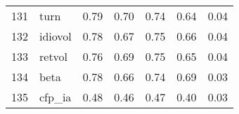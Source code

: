 \documentclass[12pt]{article}
\begin{document}
\begin{footnotesize}
\begin{longtable}{rl|c|c|c|c|c}
				131                  & turn                        & 0.79                             & 0.70                                                                                          & 0.74                                                                                          & 0.64                                                                                          & 0.04                                                                                                   \\
				132                  & idiovol                     & 0.78                             & 0.67                                                                                          & 0.75                                                                                          & 0.66                                                                                          & 0.04                                                                                                   \\
				133                  & retvol                      & 0.76                             & 0.69                                                                                          & 0.75                                                                                          & 0.65                                                                                          & 0.04                                                                                                   \\
				134                  & beta                        & 0.78                             & 0.66                                                                                          & 0.74                                                                                          & 0.69                                                                                          & 0.03                                                                                                   \\
				135                  & cfp\_ia                     & 0.48                             & 0.46                                                                                          & 0.47                                                                                          & 0.40                                                                                          & 0.03                                                                                                   \\

\end{longtable}
\end{footnotesize}
\end{document}
